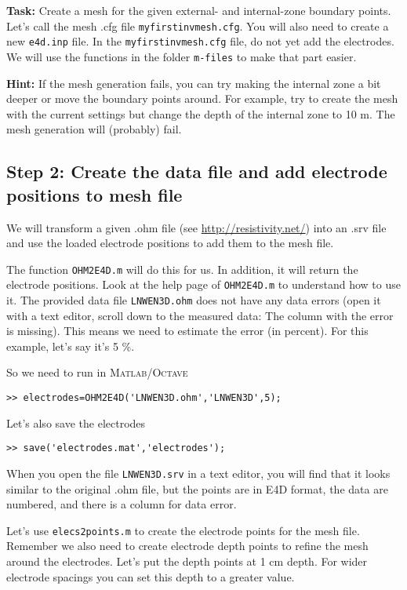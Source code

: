 \documentclass[11pt]{article}
\begin{document}
\textbf{Task:} Create a mesh for the given external- and internal-zone
boundary points. Let's call the mesh .cfg file
\verb+myfirstinvmesh.cfg+. You will also need to create a new
\verb+e4d.inp+ file. In the \verb+myfirstinvmesh.cfg+ file, do not yet
add the electrodes. We will use the functions in the folder
\verb+m-files+ to make that part easier.

\textbf{Hint:} If the mesh generation fails, you can try making the
internal zone a bit deeper or move the boundary points around. For
example, try to create the mesh with the current settings but change
the depth of the internal zone to 10 m. The mesh generation will
(probably) fail.


\subsection{Step 2: Create the data file and add electrode positions to mesh file}

We will transform a given .ohm file (see
\url{http://resistivity.net/}) into an .srv file and use the loaded
electrode positions to add them to the mesh file.

The function \verb+OHM2E4D.m+ will do this for us. In addition, it
will return the electrode positions. Look at the help page of
\verb+OHM2E4D.m+ to understand how to use it. The provided data file
\verb+LNWEN3D.ohm+ does not have any data errors (open it with a text
editor, scroll down to the measured data: The column with the error is
missing). This means we need to estimate the error (in percent). For
this example, let's say it's 5 \%.

So we need to run in \textsc{Matlab}/\textsc{Octave}

\qquad \verb+>> electrodes=OHM2E4D('LNWEN3D.ohm','LNWEN3D',5);+

Let's also save the electrodes

\qquad \verb+>> save('electrodes.mat','electrodes');+

When you open the file \verb+LNWEN3D.srv+ in a text editor, you will
find that it looks similar to the original .ohm file, but the points
are in E4D format, the data are numbered, and there is a column for
data error.

Let's use \verb+elecs2points.m+ to create the electrode points for the mesh
file. Remember we also need to create electrode depth points to refine
the mesh around the electrodes. Let's put the depth points at 1 cm
depth. For wider electrode spacings you can set this depth to a
greater value.
\end{document}
